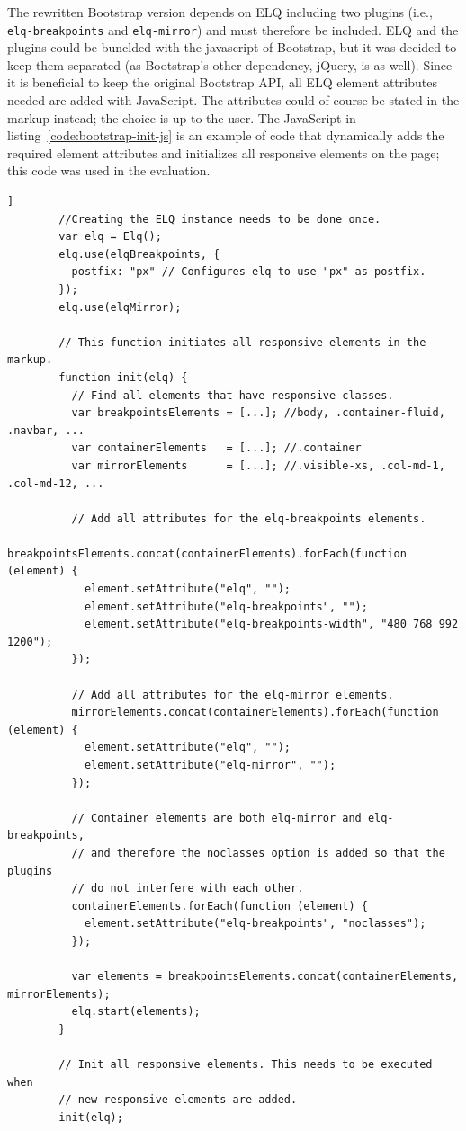 \documentclass[a4paper,11pt]{kth-mag}
\newcommand{\code}[1]{\texttt{#1}}
\begin{document}
      The rewritten Bootstrap version depends on \gls{ELQ} including two plugins (i.e., \code{elq-breakpoints} and \code{elq-mirror}) and must therefore be included.
      \gls{ELQ} and the plugins could be bunclded with the javascript of Bootstrap, but it was decided to keep them separated (as Bootstrap's other dependency, jQuery, is as well).
      Since it is beneficial to keep the original Bootstrap \gls{API}, all \gls{ELQ} element attributes needed are added with \gls{JavaScript}.
      The attributes could of course be stated in the markup instead; the choice is up to the user.
      The JavaScript in listing~\ref{code:bootstrap-init-js} is an example of code that dynamically adds the required element attributes and initializes all responsive elements on the page; this code was used in the evaluation.
      \begin{lstlisting}[gobble=8,label={code:bootstrap-init-js},caption={Example of JavaScript code that adds the required \gls{ELQ} attributes dynamically to all responsive elements and initializes them.},captionpos=b]]
        //Creating the ELQ instance needs to be done once.
        var elq = Elq();
        elq.use(elqBreakpoints, {
          postfix: "px" // Configures elq to use "px" as postfix.
        });
        elq.use(elqMirror);

        // This function initiates all responsive elements in the markup.
        function init(elq) {
          // Find all elements that have responsive classes.
          var breakpointsElements = [...]; //body, .container-fluid, .navbar, ...
          var containerElements   = [...]; //.container
          var mirrorElements      = [...]; //.visible-xs, .col-md-1, .col-md-12, ...

          // Add all attributes for the elq-breakpoints elements.
          breakpointsElements.concat(containerElements).forEach(function (element) {
            element.setAttribute("elq", "");
            element.setAttribute("elq-breakpoints", "");
            element.setAttribute("elq-breakpoints-width", "480 768 992 1200");
          });

          // Add all attributes for the elq-mirror elements.
          mirrorElements.concat(containerElements).forEach(function (element) {
            element.setAttribute("elq", "");
            element.setAttribute("elq-mirror", "");
          });

          // Container elements are both elq-mirror and elq-breakpoints,
          // and therefore the noclasses option is added so that the plugins 
          // do not interfere with each other.
          containerElements.forEach(function (element) {
            element.setAttribute("elq-breakpoints", "noclasses");
          });

          var elements = breakpointsElements.concat(containerElements, mirrorElements);
          elq.start(elements);
        }

        // Init all responsive elements. This needs to be executed when 
        // new responsive elements are added.
        init(elq);
      \end{lstlisting}
\end{document}
